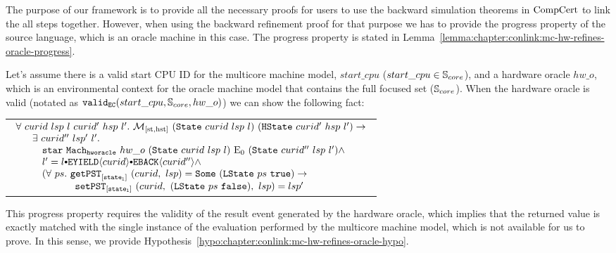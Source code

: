 The purpose of our framework is to provide all the necessary proofs
for users to use the backward simulation theorems in $\mathrm{CompCert}$ to link the all steps together. 
However, when using the backward refinement proof for that purpose we has to provide the progress property of the 
source language, which is an oracle machine in this case. 
The progress property is stated in Lemma~\ref{lemma:chapter:conlink:mc-hw-refines-oracle-progress}.

\begin{lemma}
\label{lemma:chapter:conlink:mc-hw-refines-oracle-progress}

Let's assume  there is a valid start CPU ID for the multicore machine model, 
$start\_cpu$ ($start\_cpu \in {\mathbb{S}_{core}}$), and a hardware oracle $hw\_o$,  
which is an environmental context for the oracle machine model that contains the full focused set (${\mathbb{S}_{core}}$).
When the hardware oracle is valid (notated as $ {{\mathrm{\texttt{valid}}}_{{\mathrm{\texttt{EC}}}}}({start\_cpu}, {{\mathbb{S}_{core}}}, {hw\_o})$) we can show the following fact:
\begin{center}
\begin{tabular}{P{0.95\textwidth}}
$
\begin{array}{l}
\forall \ curid \ lsp \ l \ curid' \ hsp \ l' . \ \matchstatehstate{(\mcstate{curid}{lsp}{l})}{(\hstate{curid'}{hsp}{l'})} \rightarrow \\
\ \ \ \ \  \exists \ curid'' \ lsp' \ l'  . \ \\
\ \ \ \ \   \ \ \ \ccstarstep{\oraclestep{hw\_o}{(\mcstate{curid}{lsp}{l})}{\ccemptytrace}{(\mcstate{curid''}{lsp}{l'})}} \wedge\\
\ \ \ \ \   \ \ \ l' = \listconsoppo{\yieldbackev{curid''}}{\listconsoppo{\yieldev{curid}}{l}} \wedge\\
\ \ \ \ \   \ \ \ (\forall \ ps  . \ \getpstsome{\localstatekwd}{curid}{lsp}{(\localstate{ps}{\btrue})} \rightarrow \\
\ \ \ \ \    \ \ \ \ \ \ \ \ \ \ \ \ \ \setpst{\localstatekwd}{curid}{(\localstate{ps}{\bfalse})}{lsp}{lsp'} \\
\end{array}
$
\end{tabular}
\end{center}
\end{lemma}
This progress property requires the validity of the result event generated by the hardware oracle, which implies
that the returned value is exactly matched with the single instance of the evaluation performed 
by the multicore machine model, which is not available for us to prove. 
In this sense, we  provide Hypothesis~\ref{hypo:chapter:conlink:mc-hw-refines-oracle-hypo}.

